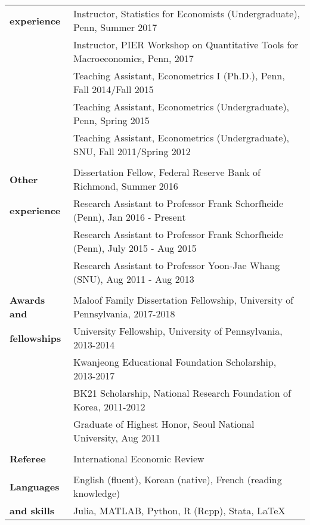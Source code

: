 \documentclass[letterpaper,11pt,oneside]{article}
\begin{document}
\begin{tabular}{@{} l l}
  \large{\textbf{experience}} &   Instructor, Statistics for Economists (Undergraduate), Penn, Summer 2017\\
& Instructor, PIER Workshop on Quantitative Tools for Macroeconomics, Penn, 2017\\%
      & Teaching Assistant, Econometrics I (Ph.D.), Penn, Fall 2014/Fall 2015 \\
     & Teaching Assistant, Econometrics (Undergraduate), Penn, Spring 2015\\
     & Teaching Assistant, Econometrics (Undergraduate), SNU, Fall 2011/Spring 2012\\
     \vspace{0.1in} \\
       \large{\textbf{Other}}   & Dissertation Fellow, Federal Reserve Bank of Richmond, Summer 2016\\
     \large{\textbf{experience}}  & Research Assistant to Professor Frank Schorfheide (Penn), Jan 2016 - Present \\
     & Research Assistant to Professor Frank Schorfheide (Penn), July 2015 - Aug 2015\\
     & Research Assistant to Professor Yoon-Jae Whang (SNU), Aug 2011 - Aug 2013\\
     \vspace{0.1in} \\
 \large\textbf{{Awards and \quad}}   & Maloof Family Dissertation Fellowship, University of Pennsylvania, 2017-2018   \\
  \large{\textbf{fellowships}}   & University Fellowship, University of Pennsylvania, 2013-2014  \\
  & Kwanjeong Educational Foundation Scholarship, 2013-2017\\
     & BK21 Scholarship, National Research Foundation of Korea, 2011-2012\\
     & Graduate of Highest Honor, Seoul National University, Aug 2011 \\
     \vspace{0.1in} \\
 \large\textbf{{Referee \quad}}   & International  Economic Review\\
     \vspace{0.1in} \\
  \large{\textbf{Languages}}   & English (fluent), Korean (native), French (reading knowledge) \\
\large{\textbf{and skills}}    & Julia, MATLAB, Python, R (Rcpp), Stata, \LaTeX \\
\end{tabular}
\end{document}
